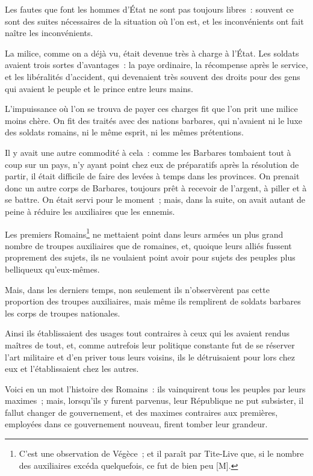 \documentclass[french,twoside]{book} %
\begin{document}
Les fautes que font les hommes d’État ne sont pas toujours libres : souvent ce sont des suites nécessaires de la situation où l’on est, et les inconvénients ont fait naître les inconvénients.\par
La milice, comme on a déjà vu, était devenue très à charge à l’État. Les soldats avaient trois sortes d’avantages : la paye ordinaire, la récompense après le service, et les libéralités d’accident, qui devenaient très souvent des droits pour des gens qui avaient le peuple et le prince entre leurs mains.\par
L’impuissance où l’on se trouva de payer ces charges fit que l’on prit une milice moins chère. On fit des traités avec des nations barbares, qui n’avaient ni le luxe des soldats romains, ni le même esprit, ni les mêmes prétentions.\par
Il y avait une autre commodité à cela : comme les Barbares tombaient tout à coup sur un pays, n’y ayant point chez eux de préparatifs après la résolution de partir, il était difficile de faire des levées à temps dans les provinces. On prenait donc un autre corps de Barbares, toujours prêt à recevoir de l’argent, à piller et à se battre. On était servi pour le moment ; mais, dans la suite, on avait autant de peine à réduire les auxiliaires que les ennemis.\par
Les premiers Romains\footnote{C’est une observation de Végèce ; et il paraît par Tite-Live que, si le nombre des auxiliaires excéda quelquefois, ce fut de bien peu [M].} ne mettaient point dans leurs armées un plus grand nombre de troupes auxiliaires que de romaines, et, quoique leurs alliés fussent proprement des sujets, ils ne voulaient point avoir pour sujets des peuples plus belliqueux qu’eux-mêmes.\par
Mais, dans les derniers temps, non seulement ils n’observèrent pas cette proportion des troupes auxiliaires, mais même ils remplirent de soldats barbares les corps de troupes nationales.\par
Ainsi ils établissaient des usages tout contraires à ceux qui les avaient rendus maîtres de tout, et, comme autrefois leur politique constante fut de se réserver l’art militaire et d’en priver tous leurs voisins, ils le détruisaient pour lors chez eux et l’établissaient chez les autres.\par
Voici en un mot l’histoire des Romains : ils vainquirent tous les peuples par leurs maximes ; mais, lorsqu’ils y furent parvenus, leur République ne put subsister, il fallut changer de gouvernement, et des maximes contraires aux premières, employées dans ce gouvernement nouveau, firent tomber leur grandeur.\par
\end{document}

